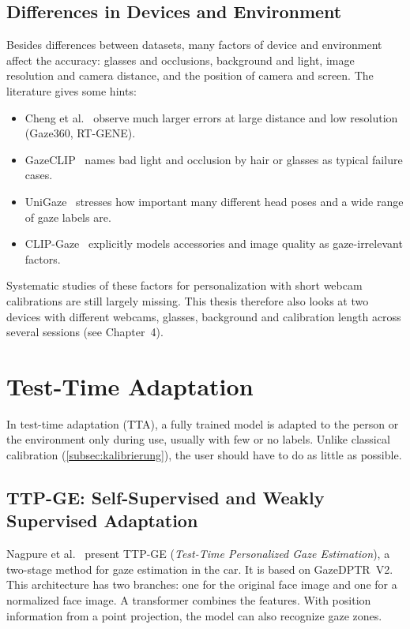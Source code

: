 \subsection{Differences in Devices and Environment}
\label{subsec:geraete}
Besides differences between datasets, many factors of device and environment
affect the accuracy: glasses and occlusions, background and light, image
resolution and camera distance, and the position of camera and screen. The
literature gives some hints:
\begin{itemize}
  \item Cheng et al.~\cite{cheng2024review} observe much larger errors at large
        distance and low resolution (Gaze360, RT-GENE).
  \item GazeCLIP~\cite{wang2026gazeclip} names bad light and occlusion by hair
        or glasses as typical failure cases.
  \item UniGaze~\cite{qin2026unigaze} stresses how important many different
        head poses and a wide range of gaze labels are.
  \item CLIP-Gaze~\cite{yin2024clipgaze} explicitly models accessories and
        image quality as gaze-irrelevant factors.
\end{itemize}
Systematic studies of these factors for personalization with short webcam
calibrations are still largely missing. This thesis therefore also looks at
two devices with different webcams, glasses, background and calibration
length across several sessions (see Chapter~4).

\section{Test-Time Adaptation}
\label{sec:tta}
In test-time adaptation (TTA), a fully trained model is adapted to the person or
the environment only during use, usually with few or no labels. Unlike classical
calibration (\cref{subsec:kalibrierung}), the user should have to do as little
as possible.

\subsection{TTP-GE: Self-Supervised and Weakly Supervised Adaptation}
\label{subsec:ttpge}
Nagpure et al.~\cite{nagpure2025ttpge} present TTP-GE (\emph{Test-Time
Personalized Gaze Estimation}), a two-stage method for gaze estimation in the
car. It is based on GazeDPTR~V2. This architecture has two branches: one for
the original face image and one for a normalized face image. A transformer
combines the features. With position information from a point projection, the
model can also recognize gaze zones.

